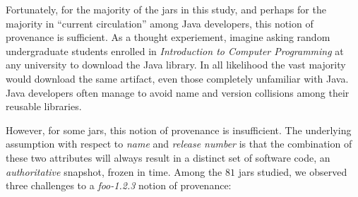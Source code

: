 Fortunately, for the majority of the jars in this study, and perhaps for
the majority in ``current circulation'' among Java developers, this notion
of provenance is sufficient.  As a thought experiement, imagine asking
random undergraduate students enrolled in \emph{Introduction to Computer
Programming} at any university to download the  Java
library.  In all likelihood the vast majority would download the same
artifact, even those completely unfamiliar with Java.  Java developers
often manage to avoid name and version collisions among their reusable
libraries.

However, for some jars, this notion of provenance is insufficient.  The
underlying assumption with respect to \emph{name} and \emph{release number}
is that the combination of these two attributes will always result in a
distinct set of software code, an \emph{authoritative} snapshot, frozen in
time.  Among the $81$ jars studied, we observed three challenges to a
\emph{foo-1.2.3} notion of provenance:

